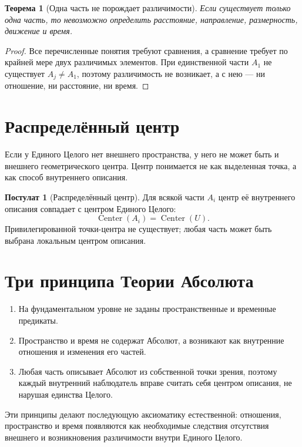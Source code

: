 \documentclass[12pt,a4paper,oneside]{book}
\theoremstyle{definition}
\newtheorem{postulate}{Постулат}[chapter]
\theoremstyle{plain}
\newtheorem{theorem}{Теорема}[chapter]
\theoremstyle{remark}
\newcommand{\Whole}{U}
\newcommand{\Center}{\operatorname{Center}}
\begin{document}
\begin{theorem}[Одна часть не порождает различимости]
Если существует только одна часть, то невозможно определить расстояние, направление,
размерность, движение и время.
\end{theorem}

\begin{proof}
Все перечисленные понятия требуют сравнения, а сравнение требует по крайней мере двух
различимых элементов. При единственной части $A_1$ не существует $A_j\neq A_1$,
поэтому различимость не возникает, а с нею --- ни отношение, ни расстояние, ни время.
\end{proof}

\section{Распределённый центр}

Если у Единого Целого нет внешнего пространства, у него не может быть и внешнего
геометрического центра. Центр понимается не как выделенная точка, а как способ
внутреннего описания.

\begin{postulate}[Распределённый центр]
Для всякой части $A_i$ центр её внутреннего описания совпадает с центром Единого
Целого:
\[
\Center(A_i)=\Center(\Whole).
\]
Привилегированной точки-центра не существует; любая часть может быть выбрана
локальным центром описания.
\end{postulate}

\section{Три принципа Теории Абсолюта}

\begin{enumerate}
    \item На фундаментальном уровне не заданы пространственные и временные
    предикаты.
    \item Пространство и время не содержат Абсолют, а возникают как внутренние
    отношения и изменения его частей.
    \item Любая часть описывает Абсолют из собственной точки зрения, поэтому каждый
    внутренний наблюдатель вправе считать себя центром описания, не нарушая единства
    Целого.
\end{enumerate}

Эти принципы делают последующую аксиоматику естественной: отношения, пространство и
время появляются как необходимые следствия отсутствия внешнего и возникновения
различимости внутри Единого Целого.
\end{document}
